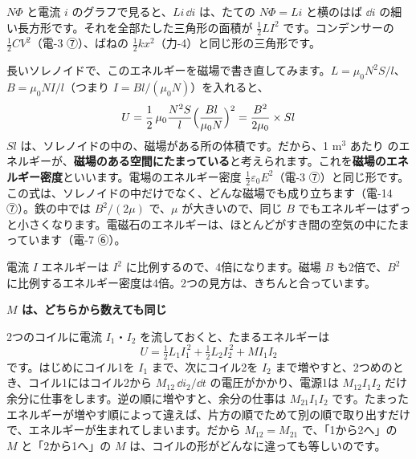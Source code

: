\noindent\begin{minipage}[c]{0.44\linewidth}\centering
{}
\end{minipage}\hfill
\begin{minipage}[c]{0.53\linewidth}\raggedright
$N\Phi$ と電流 $i$ のグラフで見ると、$Li\,\dd i$ は、たての $N\Phi=Li$ と横のはば $\dd i$ の細い長方形です。それを全部たした三角形の面積が $\tfrac12LI^2$ です。コンデンサーの $\tfrac12CV^2$（電-3 ⑦）、ばねの $\tfrac12kx^2$（力-4）と同じ形の三角形です。
\end{minipage}

長いソレノイドで、このエネルギーを磁場で書き直してみます。$L=\mu_0N^2S/l$、$B=\mu_0NI/l$（つまり $I=Bl/(\mu_0N)$）を入れると、
\[ U=\frac12\,\mu_0\frac{N^2S}{l}\Bigl(\frac{Bl}{\mu_0N}\Bigr)^2=\frac{B^2}{2\mu_0}\times Sl \]
$Sl$ は、ソレノイドの中の、磁場がある所の体積です。だから、1 m$^3$ あたり
のエネルギーが、\textbf{磁場のある空間にたまっている}と考えられます。これを\textbf{磁場のエネルギー密度}といいます。電場のエネルギー密度 $\tfrac12\varepsilon_0E^2$（電-3 ⑦）と同じ形です。この式は、ソレノイドの中だけでなく、どんな磁場でも成り立ちます（電-14 ⑦）。鉄の中では $B^2/(2\mu)$ で、$\mu$ が大きいので、同じ $B$ でもエネルギーはずっと小さくなります。電磁石のエネルギーは、ほとんどがすき間の空気の中にたまっています（電-7 ⑥）。

\begin{phbaisuru}{電流 $I$}
エネルギーは $I^2$ に比例するので、4倍になります。磁場 $B$ も2倍で、$B^2$ に比例するエネルギー密度は4倍。2つの見方は、きちんと合っています。
\end{phbaisuru}

\begin{motto}[4]
\textbf{$M$ は、どちらから数えても同じ}\par
2つのコイルに電流 $I_1$・$I_2$ を流しておくと、たまるエネルギーは
\[ U=\tfrac12L_1I_1^{\,2}+\tfrac12L_2I_2^{\,2}+MI_1I_2 \]
です。はじめにコイル1を $I_1$ まで、次にコイル2を $I_2$ まで増やすと、2つめのとき、コイル1にはコイル2から $M_{12}\,\dd i_2/\dd t$ の電圧がかかり、電源1は $M_{12}I_1I_2$ だけ余分に仕事をします。逆の順に増やすと、余分の仕事は $M_{21}I_1I_2$ です。たまったエネルギーが増やす順によって違えば、片方の順でためて別の順で取り出すだけで、エネルギーが生まれてしまいます。だから $M_{12}=M_{21}$ で、「1から2へ」の $M$ と「2から1へ」の $M$ は、コイルの形がどんなに違っても等しいのです。
\end{motto}

